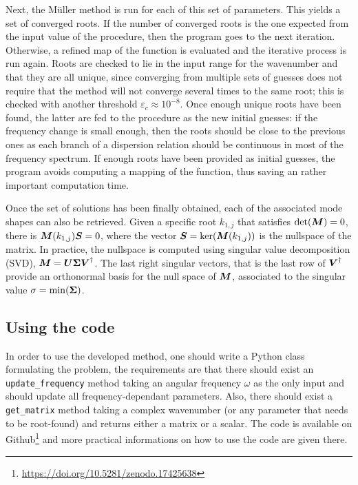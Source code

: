 Next, the Müller method is run for each of this set of parameters. This yields a set of converged roots. If the number of converged roots is the one expected from the input value of the procedure, then the program goes to the next iteration. Otherwise, a refined map of the function is evaluated and the iterative process is run again. Roots are checked to lie in the input range for the wavenumber and that they are all unique, since converging from multiple sets of guesses does not require that the method will not converge several times to the same root; this is checked with another threshold $\varepsilon_c\approx 10^{-8}$. Once enough unique roots have been found, the latter are fed to the procedure as the new initial guesses: if the frequency change is small enough, then the roots should be close to the previous ones as each branch of a dispersion relation should be continuous in most of the frequency spectrum. If enough roots have been provided as initial guesses, the program avoids computing a mapping of the function, thus saving an rather important computation time.

Once the set of solutions has been finally obtained, each of the associated mode shapes can also be retrieved. Given a specific root $k_{1,j}$ that satisfies $\mathrm{det}(\boldsymbol M) = 0$, there is $\boldsymbol M(k_{1,j}) \boldsymbol S = 0$, where the vector $\boldsymbol S = \mathrm{ker}(\boldsymbol M(k_{1,j}))$ is the nullspace of the matrix. In practice, the nullspace is computed using singular value decomposition (SVD), $\boldsymbol M = \boldsymbol U \boldsymbol \Sigma \boldsymbol V^\dagger$. The last right singular vectors, that is the last row of $\boldsymbol V^\dagger$ provide an orthonormal basis for the null space of $\boldsymbol M$, associated to the singular value $\sigma = \mathrm{min}(\boldsymbol \Sigma)$.

\subsection{Using the code}
In order to use the developed method, one should write a Python class formulating the problem, the requirements are that there should exist an 
\texttt{update\_frequency} method taking an angular frequency $\omega$ as the only input and should update all frequency-dependant parameters. Also, there should exist a \texttt{get\_matrix} method taking a complex wavenumber (or any parameter that needs to be root-found) and returns either a matrix or a scalar. The code is available on Github\footnote{\url{https://doi.org/10.5281/zenodo.17425638}} and more practical informations on how to use the code are given there.

\newpage